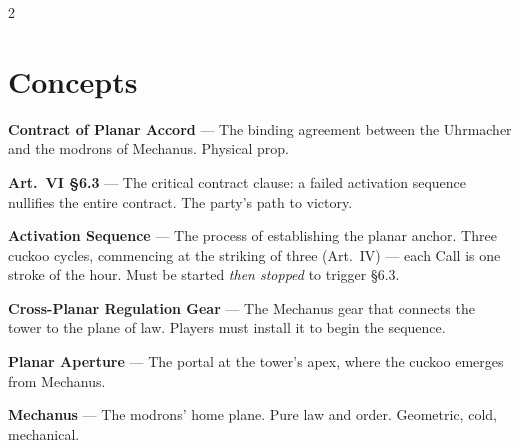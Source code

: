 \documentclass[10pt,letterpaper]{article}
\begin{document}
\begin{multicols}{2}
\section*{Concepts}

\textbf{Contract of Planar Accord} --- The binding agreement between the Uhrmacher and the modrons of Mechanus. Physical prop.

\textbf{Art.\ VI \S6.3} --- The critical contract clause: a failed activation sequence nullifies the entire contract. The party's path to victory.

\textbf{Activation Sequence} --- The process of establishing the planar anchor. Three cuckoo cycles, commencing at the striking of three (Art.\ IV) --- each Call is one stroke of the hour. Must be started \textit{then stopped} to trigger \S6.3.

\textbf{Cross-Planar Regulation Gear} --- The Mechanus gear that connects the tower to the plane of law. Players must install it to begin the sequence.

\textbf{Planar Aperture} --- The portal at the tower's apex, where the cuckoo emerges from Mechanus.

\textbf{Mechanus} --- The modrons' home plane. Pure law and order. Geometric, cold, mechanical.

\end{multicols}
\end{document}
